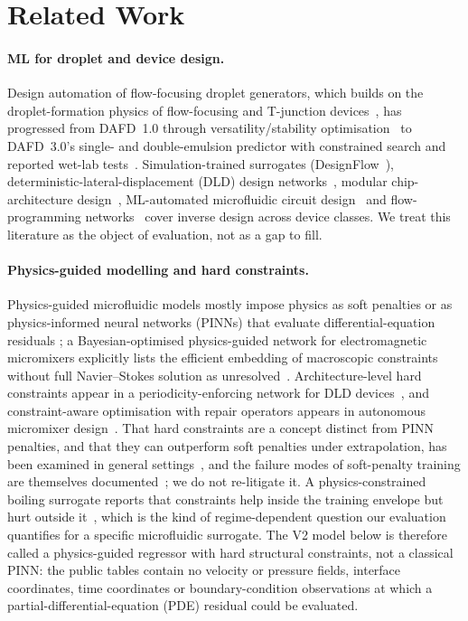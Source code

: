 \documentclass[11pt,a4paper]{article}
\begin{document}
\section{Related Work}
\label{sec:related}

\paragraph{ML for droplet and device design.} Design automation of
flow-focusing droplet generators, which builds on the droplet-formation
physics of flow-focusing and T-junction devices~\cite{anna2003,garstecki2006},
has progressed from DAFD~1.0
\cite{lashkaripour2021} through versatility/stability
optimisation~\cite{mcintyre2023} to DAFD~3.0's single- and double-emulsion
predictor with constrained search and reported wet-lab
tests~\cite{lashkaripour2024}. Simulation-trained surrogates
(DesignFlow~\cite{samari2025}), deterministic-lateral-displacement (DLD) design
networks~\cite{vatandoust2022}, modular chip-architecture
design~\cite{li2026pathchip}, ML-automated microfluidic circuit
design~\cite{mufg2026} and flow-programming networks~\cite{ceyehao2026}
cover inverse design across device classes. We treat this literature as the
object of evaluation, not as a gap to fill.

\paragraph{Physics-guided modelling and hard constraints.} Physics-guided
microfluidic models mostly impose physics as soft penalties or as
physics-informed neural networks (PINNs) that evaluate differential-equation residuals
\cite{raissi2019,karniadakis2021,bpgnn2026,flexpinn2026}; a Bayesian-optimised physics-guided
network for electromagnetic micromixers explicitly lists the efficient
embedding of macroscopic constraints without full Navier--Stokes solution as
unresolved~\cite{bpgnn2026}. Architecture-level hard constraints appear in a
periodicity-enforcing network for DLD devices~\cite{lee2025}, and
constraint-aware optimisation with repair operators appears in autonomous
micromixer design~\cite{micromixer2026}. That hard constraints are a concept
distinct from PINN penalties, and that they can outperform soft penalties
under extrapolation, has been examined in general
settings~\cite{naturecs2021,lu2021,beucler2021,baty2023,prnet2026}, and the
failure modes of soft-penalty training are themselves
documented~\cite{krishnapriyan2021}; we do not re-litigate it. A
physics-constrained boiling surrogate reports that constraints help inside
the training envelope but hurt outside it~\cite{filmpinn2026}, which is the
kind of regime-dependent question our evaluation quantifies for a specific
microfluidic surrogate. The V2 model below is therefore called a physics-guided regressor with
hard structural constraints, not a classical PINN: the public tables contain
no velocity or pressure fields, interface coordinates, time coordinates or
boundary-condition observations at which a partial-differential-equation (PDE) residual could be evaluated.
\end{document}
